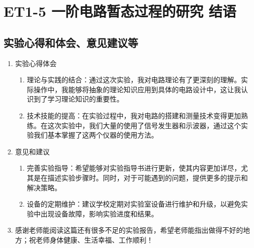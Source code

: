 \documentclass[dvipsnames, svgnames,a4paper,11pt]{article}
\begin{document}
	
	
	
	
	\clearpage
	
	\section{ET1-5 一阶电路暂态过程的研究 \quad\heiti 结语}
	
	\subsection{实验心得和体会、意见建议等}
	\begin{enumerate}
		\item 实验心得体会
			\begin{enumerate}
				\item 理论与实践的结合：通过这次实验，我对电路理论有了更深刻的理解。实际操作中，我能够将抽象的理论知识应用到具体的电路设计中，这让我认识到了学习理论知识的重要性。
				
				\item 技术技能的提高：在实验过程中，我对电路的搭建和测量技术变得更加熟练。在这次实验中，我们大量的使用了信号发生器和示波器，通过这个实验我们基本掌握了这两个仪器的使用方法。
				
			\end{enumerate}
		
		\item 意见和建议
			\begin{enumerate}
				\item 完善实验指导：希望能够对实验指导书进行更新，使其内容更加详尽，尤其是在描述实验步骤时。同时，对于可能遇到的问题，提供更多的提示和解决策略。
				
				\item 设备的定期维护：建议学校定期对实验室设备进行维护和升级，以避免实验中出现设备故障，影响实验进度和结果。
				

			\end{enumerate}
			
		\item 感谢老师能阅读这篇还有很多不足的实验报告，希望老师能指出做得不好的地方；祝老师身体健康、生活幸福、工作顺利！
	\end{enumerate}
	
\end{document}
